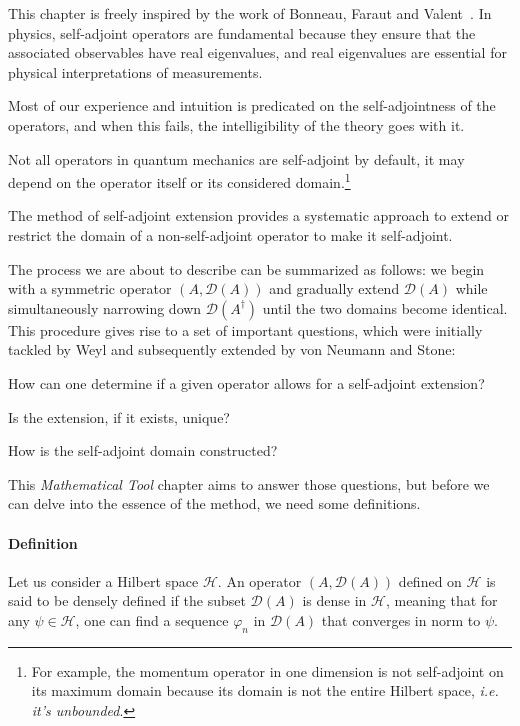 This chapter is freely inspired by the work of Bonneau, Faraut and Valent~\cite{Bonneau_2001}.
In physics, self-adjoint operators are
fundamental because they ensure that the associated observables have real
eigenvalues, and real eigenvalues are essential for physical interpretations of
measurements.

Most of our experience and intuition is predicated on the self-adjointness of the operators, and when this fails, the intelligibility of the theory goes with it.

Not all operators in quantum mechanics are self-adjoint by default, it may
depend on the operator itself or its considered domain.\footnote{For example,
    the momentum operator in one dimension is not self-adjoint on its maximum
    domain because its domain is not the entire Hilbert space, \textit{i.e. it's unbounded}.}

The method of self-adjoint extension provides a systematic approach to extend
or restrict the domain of a non-self-adjoint operator to make it self-adjoint.

The process we are about to describe can be summarized as follows: we begin with a symmetric operator $(A,\mathcal{D}(A))$ and gradually extend $\mathcal{D}(A)$ while simultaneously narrowing down $\mathcal{D}({A^\dagger})$ until the two domains become identical. This procedure gives rise to a set of important questions, which were initially tackled by Weyl and subsequently extended by von Neumann and Stone: 

How can one determine if a given operator allows for a self-adjoint extension? 

Is the extension, if it exists, unique? 

How is the self-adjoint domain constructed?


\vspace{4mm}
\noindent
This \textit{Mathematical Tool} chapter aims to answer those questions, but before we can delve into the essence of the method, we need some definitions.

\paragraph{Definition} Let us consider a Hilbert space $\mathcal{H}$. An operator $(A, \mathcal{D}(A))$ defined
on $\mathcal{H}$ is said to be densely defined if the subset $\mathcal{D}(A)$ is dense in
$\mathcal{H}$, meaning that for any $\psi \in \mathcal{H}$, one can find a sequence $\varphi_n$ in
$\mathcal{D}(A)$ that converges in norm to $\psi$.

